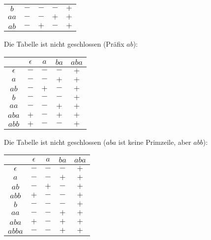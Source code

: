 \documentclass[11pt,a4paper]{article}
\begin{document}
\begin{loesung}
\begin{enumerate}
\begin{table}[h!]
\begin{tabular}{c|cccc}
                $b$ & $-$ & $-$ & $-$ & $+$ \\
                $aa$ & $-$ & $-$ & $+$ & $+$ \\
                $ab$ & $-$ & $+$ & $-$ & $+$ \\
            \end{tabular}
        \end{table}
        \FloatBarrier
        Die Tabelle ist nicht geschlossen (Präfix $ab$):
        \begin{table}[h!]
            \centering
            \begin{tabular}{c|cccc}
                & $\epsilon$ & $a$ & $ba$ & $aba$ \\
                \hline
                $\epsilon$ & $-$ & $-$ & $-$ & $+$ \\
                $a$ & $-$ & $-$ & $+$ & $+$ \\
                $ab$ & $-$ & $+$ & $-$ & $+$ \\
                \hline
                $b$ & $-$ & $-$ & $-$ & $+$ \\
                $aa$ & $-$ & $-$ & $+$ & $+$ \\
                $aba$ & $+$ & $-$ & $+$ & $+$ \\
                $abb$ & $+$ & $-$ & $-$ & $+$ \\
            \end{tabular}
        \end{table}
        \FloatBarrier
        Die Tabelle ist nicht geschlossen ($aba$ ist keine Primzeile, aber $abb$):
        \begin{table}[h!]
            \centering
            \begin{tabular}{c|cccc}
                & $\epsilon$ & $a$ & $ba$ & $aba$ \\
                \hline
                $\epsilon$ & $-$ & $-$ & $-$ & $+$ \\
                $a$ & $-$ & $-$ & $+$ & $+$ \\
                $ab$ & $-$ & $+$ & $-$ & $+$ \\
                $abb$ & $+$ & $-$ & $-$ & $+$ \\
                \hline
                $b$ & $-$ & $-$ & $-$ & $+$ \\
                $aa$ & $-$ & $-$ & $+$ & $+$ \\
                $aba$ & $+$ & $-$ & $+$ & $+$ \\
                $abba$ & $-$ & $-$ & $+$ & $+$ \\

\end{tabular}
\end{table}
\end{enumerate}
\end{loesung}
\end{document}
